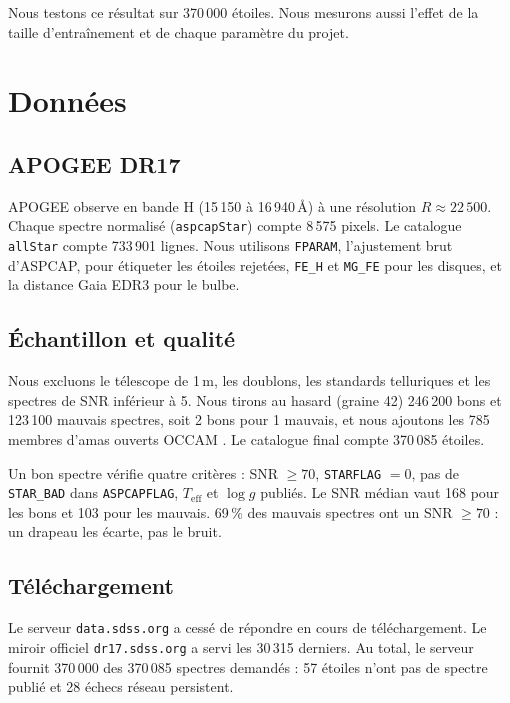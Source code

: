 \documentclass[11pt,a4paper]{article}
\newcommand{\logg}{$\log g$}
\newcommand{\teff}{$T_{\mathrm{eff}}$}
\begin{document}
Nous testons ce résultat sur 370\,000 étoiles. Nous mesurons aussi l'effet de la taille d'entraînement et de chaque paramètre du projet.

\section{Données}

\subsection{APOGEE DR17}

APOGEE observe en bande H (15\,150 à 16\,940\,Å) à une résolution $R \approx 22\,500$. Chaque spectre normalisé (\texttt{aspcapStar}) compte 8\,575 pixels. Le catalogue \texttt{allStar} compte 733\,901 lignes. Nous utilisons \texttt{FPARAM}, l'ajustement brut d'ASPCAP, pour étiqueter les étoiles rejetées, \texttt{FE\_H} et \texttt{MG\_FE} pour les disques, et la distance Gaia EDR3 pour le bulbe.

\subsection{Échantillon et qualité}

Nous excluons le télescope de 1\,m, les doublons, les standards telluriques et les spectres de SNR inférieur à 5. Nous tirons au hasard (graine 42) 246\,200 bons et 123\,100 mauvais spectres, soit 2 bons pour 1 mauvais, et nous ajoutons les 785 membres d'amas ouverts OCCAM \cite{occam}. Le catalogue final compte 370\,085 étoiles.

Un bon spectre vérifie quatre critères : SNR $\geq 70$, \texttt{STARFLAG} $= 0$, pas de \texttt{STAR\_BAD} dans \texttt{ASPCAPFLAG}, \teff{} et \logg{} publiés. Le SNR médian vaut 168 pour les bons et 103 pour les mauvais. 69\,\% des mauvais spectres ont un SNR $\geq 70$ : un drapeau les écarte, pas le bruit.

\subsection{Téléchargement}

Le serveur \texttt{data.sdss.org} a cessé de répondre en cours de téléchargement. Le miroir officiel \texttt{dr17.sdss.org} a servi les 30\,315 derniers. Au total, le serveur fournit 370\,000 des 370\,085 spectres demandés : 57 étoiles n'ont pas de spectre publié et 28 échecs réseau persistent.
\end{document}
